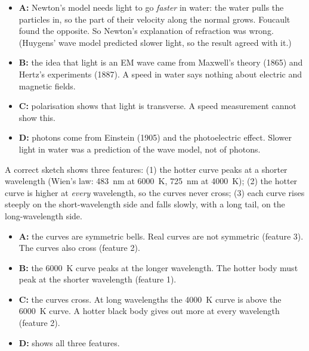 \begin{practiceanswers}
\begin{practiceans}
  \begin{itemize}
    \item[\cmark] \textbf{A:} Newton's model needs light to go \emph{faster} in water: the water
      pulls the particles in, so the part of their velocity along the normal grows. Foucault
      found the opposite. So Newton's explanation of refraction was wrong. (Huygens' wave model
      predicted slower light, so the result agreed with it.)
    \item[\xmark] \textbf{B:} the idea that light is an EM wave came from Maxwell's theory (1865)
      and Hertz's experiments (1887). A speed in water says nothing about electric and magnetic
      fields.
    \item[\xmark] \textbf{C:} polarisation shows that light is transverse. A speed measurement
      cannot show this.
    \item[\xmark] \textbf{D:} photons come from Einstein (1905) and the photoelectric effect.
      Slower light in water was a prediction of the wave model, not of photons.
  \end{itemize}
\end{practiceans}

\begin{practiceans}
  A correct sketch shows three features:
  (1) the hotter curve peaks at a shorter wavelength (Wien's law: \qty{483}{nm} at \qty{6000}{K},
  \qty{725}{nm} at \qty{4000}{K});
  (2) the hotter curve is higher at \emph{every} wavelength, so the curves never cross;
  (3) each curve rises steeply on the short-wavelength side and falls slowly, with a long tail,
  on the long-wavelength side.
  \begin{itemize}
    \item[\xmark] \textbf{A:} the curves are symmetric bells. Real curves are not symmetric
      (feature 3). The curves also cross (feature 2).
    \item[\xmark] \textbf{B:} the \qty{6000}{K} curve peaks at the longer wavelength. The hotter
      body must peak at the shorter wavelength (feature 1).
    \item[\xmark] \textbf{C:} the curves cross. At long wavelengths the \qty{4000}{K} curve is
      above the \qty{6000}{K} curve. A hotter black body gives out more at every wavelength
      (feature 2).
    \item[\cmark] \textbf{D:} shows all three features.
  \end{itemize}
\end{practiceans}


\end{practiceanswers}
